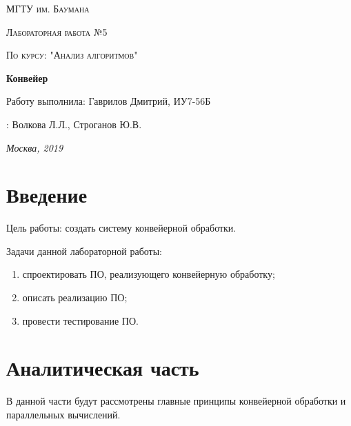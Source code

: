 \documentclass[12pt]{report}
\begin{document}
\begin{titlepage}
	\centering
	{\scshape\LARGE МГТУ им. Баумана \par}
	\vspace{3cm}
	{\scshape\Large Лабораторная работа №5\par}
	\vspace{0.5cm}	
	{\scshape\Large По курсу: "Анализ алгоритмов"\par}
	\vspace{1.5cm}
	{\huge\bfseries Конвейер \par}
	\vspace{2cm}
	\Large Работу выполнила: Гаврилов Дмитрий, ИУ7-56Б\par
	\vspace{0.5cm}
	:  Волкова Л.Л., Строганов Ю.В.\par

	\vfill
	\large \textit {Москва, 2019} \par
\end{titlepage}

\tableofcontents

\newpage
\chapter*{Введение}
Цель работы: создать систему конвейерной обработки.

Задачи данной лабораторной работы:
\begin{enumerate}
        \item спроектировать ПО, реализующего конвейерную обработку;
        \item описать реализацию ПО;
        \item провести тестирование ПО.
\end{enumerate}



\chapter{Аналитическая часть}
В данной части будут рассмотрены главные принципы конвейерной обработки и параллельных вычислений.
\end{document}
